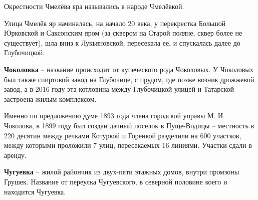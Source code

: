 Окрестности Чмелёва яра назывались в народе Чмелёвкой.

Улица Чмелёв яр начиналась, на начало 20 века, у перекрестка Большой Юрковской и Саксонским яром (за сквером на Старой поляне, сквер более не существует), шла вниз к Лукьяновской, пересекала ее, и спускалась далее до Глубочицкой.\\


\medskip

\textbf{Чоколовка} – название происходит от купеческого рода Чоколовых. У Чоколовых был также спиртовой завод на Глубочице, с прудом, где позже возник дрожжевой завод, а в 2016 году эта котловина между Глубочицкой улицей и Татарской застроена жилым комплексом.

Именно по предложению думе 1893 года члена городской управы М. И. Чоколова, в 1899 году был создан дачный поселок в Пуще-Водицы – местность в 220 десятин между речками Котуркой и Горенкой разделили на 600 участков, между которыми проложили 7 улиц, пересекаемых 16 линиями. Участки сдали в аренду.

\medskip


\textbf{Чугуевка} – жилой райончик из двух-пяти этажных домов, внутри промзоны Грушек. Название от переулка Чугуевского, в северной половине коего и находится Чугуевка.